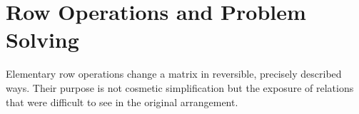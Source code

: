 \section{Row Operations and Problem Solving}

\begin{corebox}
Elementary row operations change a matrix in reversible, precisely described
ways. Their purpose is not cosmetic simplification but the exposure of relations
that were difficult to see in the original arrangement.
\end{corebox}




